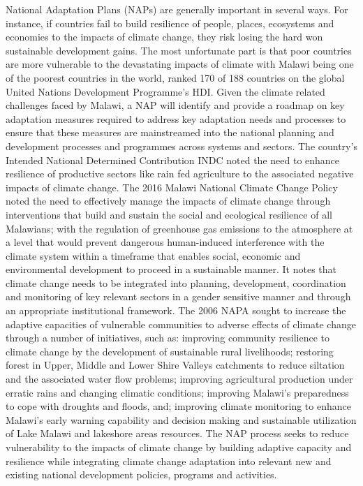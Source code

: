 \documentclass[
]{book}
\begin{document}
National Adaptation Plans (NAPs) are generally important in several ways. For instance, if countries fail to build resilience of people, places, ecosystems and
economies to the impacts of climate change, they risk losing the hard won sustainable development gains. The most unfortunate part is that poor countries are
more vulnerable to the devastating impacts of climate with Malawi being one of the poorest countries in the world, ranked 170 of 188 countries on the global
United Nations Development Programme's HDI. Given the climate related challenges faced by Malawi, a NAP will identify and provide a roadmap on key adaptation
measures required to address key adaptation needs and processes to ensure that these measures are mainstreamed into the national planning and development
processes and programmes across systems and sectors. The country's Intended National Determined Contribution INDC noted the need to enhance resilience of
productive sectors like rain fed agriculture to the associated negative impacts of climate change. The 2016 Malawi National Climate Change Policy noted the need
to effectively manage the impacts of climate change through interventions that build and sustain the social and ecological resilience of all Malawians; with the
regulation of greenhouse gas emissions to the atmosphere at a level that would prevent dangerous human-induced interference with the climate system within a
timeframe that enables social, economic and environmental development to proceed in a sustainable manner. It notes that climate change needs to be integrated
into planning, development, coordination and monitoring of key relevant sectors in a gender sensitive manner and through an appropriate institutional framework.
The 2006 NAPA sought to increase the adaptive capacities of vulnerable communities to adverse effects of climate change through a number of initiatives, such as:
improving community resilience to climate change by the development of sustainable rural livelihoods; restoring forest in Upper, Middle and Lower Shire Valleys
catchments to reduce siltation and the associated water flow problems; improving agricultural production under erratic rains and changing climatic conditions;
improving Malawi's preparedness to cope with droughts and floods, and; improving climate monitoring to enhance Malawi's early warning capability and decision
making and sustainable utilization of Lake Malawi and lakeshore areas resources. The NAP process seeks to reduce vulnerability to the impacts of climate change
by building adaptive capacity and resilience while integrating climate change adaptation into relevant new and existing national development policies, programs
and activities.
\end{document}
